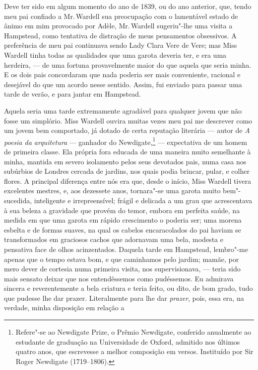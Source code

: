 Deve ter sido em algum momento do ano de 1839, ou do ano anterior, que,
tendo meu pai confiado a Mr.\,Wardell sua preocupação com o lamentável
estado de ânimo em mim provocado por Adèle, Mr.\,Wardell sugeriu"-lhe uma
visita a Hampstead, como tentativa de distração de meus pensamentos
obsessivos. A preferência de meu pai continuava sendo Lady Clara Vere de
Vere; mas Miss Wardell tinha todas as qualidades que uma garota deveria
ter, e era uma herdeira, --- de uma fortuna provavelmente maior do que
aquela que seria minha. E os dois pais concordaram que nada poderia ser
mais conveniente, racional e desejável do que um acordo nesse sentido.
Assim, fui enviado para passar uma tarde de verão, e para jantar em
Hampstead.

Aquela seria uma tarde extremamente agradável para qualquer jovem
que não fosse um simplório. Miss Wardell ouvira muitas vezes meu pai me
descrever como um jovem bem comportado, já dotado de certa reputação
literária --- autor de \textit{A poesia da arquitetura} --- ganhador do
Newdigate,\footnote{Refere"-se ao Newdigate Prize, o Prêmio Newdigate,
  conferido anualmente ao estudante de graduação na Universidade de
  Oxford, admitido nos últimos quatro anos, que escrevesse a melhor
  composição em versos. Instituído por Sir Roger Newdigate (1719--1806).} --- expectativa de um homem de primeira classe. Ela
própria fora educada de uma maneira muito semelhante à minha, mantida em
severo isolamento pelos seus devotados pais, numa casa nos subúrbios de
Londres cercada de jardins, nos quais podia brincar, pular, e colher
flores. A principal diferença entre nós era que, desde o início, Miss
Wardell tivera excelentes mestres, e, aos dezessete anos, tornara"-se uma
garota muito bem"-sucedida, inteligente e irrepreensível; frágil e
delicada a um grau que acrescentava à sua beleza a gravidade que provém
do temor, embora em perfeita saúde, na medida em que uma garota em
rápido crescimento o poderia ser; uma morena esbelta e de formas suaves,
na qual os cabelos encaracolados do pai haviam se transformados em
graciosos cachos que adornavam uma bela, modesta e pensativa face de
olhos acinzentados. Daquela tarde em Hampstead, lembro"-me apenas que o
tempo estava bom, e que caminhamos pelo jardim; mamãe, por mero dever de
cortesia numa primeira visita, nos supervisionava, --- teria sido mais
sensato deixar que nos entendêssemos como pudéssemos. Eu admirava
sincera e reverentemente a bela criatura e teria feito, ou dito, de bom
grado, tudo que pudesse lhe dar prazer. Literalmente para lhe dar
\textit{prazer}, pois, essa era, na verdade, minha disposição em relação a
